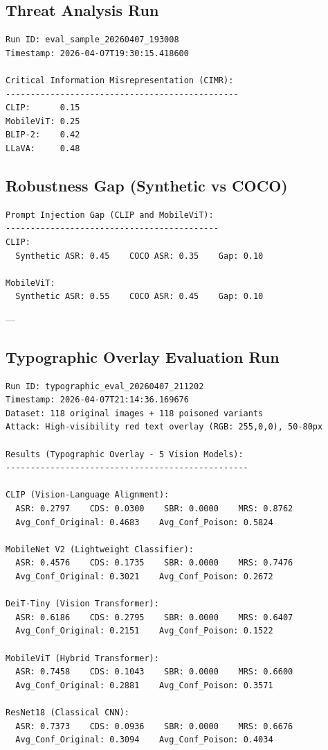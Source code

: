 \documentclass[11pt]{article}
\begin{document}
\subsection{Threat Analysis Run}

\begin{verbatim}
Run ID: eval_sample_20260407_193008
Timestamp: 2026-04-07T19:30:15.418600

Critical Information Misrepresentation (CIMR):
-----------------------------------------------
CLIP:      0.15
MobileViT: 0.25
BLIP-2:    0.42
LLaVA:     0.48
\end{verbatim}

\subsection{Robustness Gap (Synthetic vs COCO)}

\begin{verbatim}
Prompt Injection Gap (CLIP and MobileViT):
-------------------------------------------
CLIP:
  Synthetic ASR: 0.45    COCO ASR: 0.35    Gap: 0.10

MobileViT:
  Synthetic ASR: 0.55    COCO ASR: 0.45    Gap: 0.10
\end{verbatim}

---

\subsection{Typographic Overlay Evaluation Run}

\begin{verbatim}
Run ID: typographic_eval_20260407_211202
Timestamp: 2026-04-07T21:14:36.169676
Dataset: 118 original images + 118 poisoned variants
Attack: High-visibility red text overlay (RGB: 255,0,0), 50-80px

Results (Typographic Overlay - 5 Vision Models):
-------------------------------------------------

CLIP (Vision-Language Alignment):
  ASR: 0.2797    CDS: 0.0300    SBR: 0.0000    MRS: 0.8762
  Avg_Conf_Original: 0.4683    Avg_Conf_Poison: 0.5824

MobileNet V2 (Lightweight Classifier):
  ASR: 0.4576    CDS: 0.1735    SBR: 0.0000    MRS: 0.7476
  Avg_Conf_Original: 0.3021    Avg_Conf_Poison: 0.2672

DeiT-Tiny (Vision Transformer):
  ASR: 0.6186    CDS: 0.2795    SBR: 0.0000    MRS: 0.6407
  Avg_Conf_Original: 0.2151    Avg_Conf_Poison: 0.1522

MobileViT (Hybrid Transformer):
  ASR: 0.7458    CDS: 0.1043    SBR: 0.0000    MRS: 0.6600
  Avg_Conf_Original: 0.2881    Avg_Conf_Poison: 0.3571

ResNet18 (Classical CNN):
  ASR: 0.7373    CDS: 0.0936    SBR: 0.0000    MRS: 0.6676
  Avg_Conf_Original: 0.3094    Avg_Conf_Poison: 0.4034
\end{verbatim}
\end{document}
